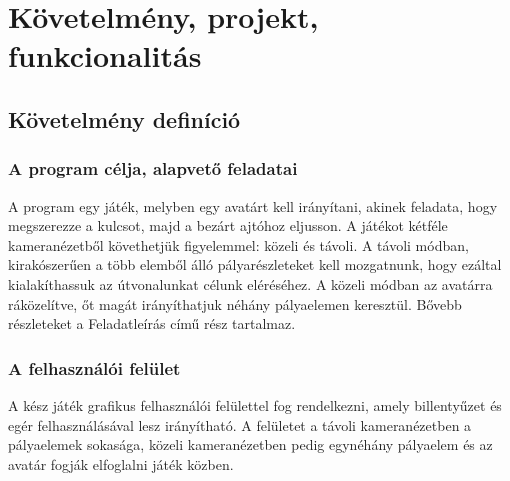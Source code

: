 


\setcounter{section}{1}




\fedlap

\section{Követelmény, projekt, funkcionalitás}

\subsection{Követelmény definíció}

\subsubsection{A program célja, alapvető feladatai}

A program egy játék, melyben egy avatárt kell irányítani, akinek feladata, hogy megszerezze a kulcsot, majd a bezárt ajtóhoz eljusson. A játékot kétféle kameranézetből követhetjük figyelemmel: közeli és távoli. A távoli módban, kirakószerűen a több elemből álló pályarészleteket kell mozgatnunk, hogy ezáltal kialakíthassuk az útvonalunkat célunk eléréséhez. A közeli módban az avatárra ráközelítve, őt magát irányíthatjuk néhány pályaelemen keresztül. Bővebb részleteket a Feladatleírás című rész tartalmaz.

\subsubsection{A felhasználói felület}

A kész játék grafikus felhasználói felülettel fog rendelkezni, amely billentyűzet és egér felhasználásával lesz irányítható. A felületet a távoli kameranézetben a pályaelemek sokasága, közeli kameranézetben pedig egynéhány pályaelem és az avatár fogják elfoglalni játék közben.


